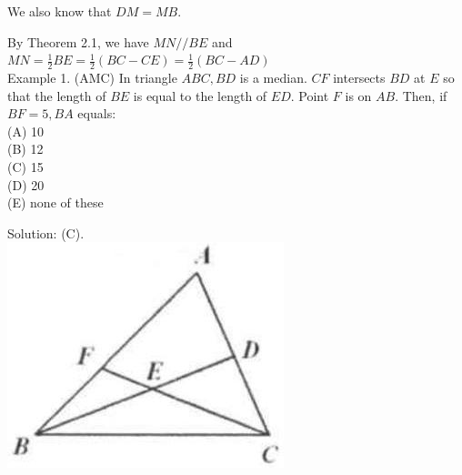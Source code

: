 \documentclass[10pt]{article}
\begin{document}
We also know that \(D M=M B\).

By Theorem 2.1, we have \(M N / / B E\) and\\
\(M N=\frac{1}{2} B E=\frac{1}{2}(B C-C E)=\frac{1}{2}(B C-A D)\)\\
Example 1. (AMC) In triangle \(A B C, B D\) is a median. \(C F\) intersects \(B D\) at \(E\) so that the length of \(B E\) is equal to the length of \(E D\). Point \(F\) is on \(A B\). Then, if \(B F=5, B A\) equals:\\
(A) 10\\
(B) 12\\
(C) 15\\
(D) 20\\
(E) none of these

Solution: (C).\\
\includegraphics[max width=\textwidth, center]{2025_04_17_97bc1f7e44d93c271a88g-035(1)}
\end{document}

